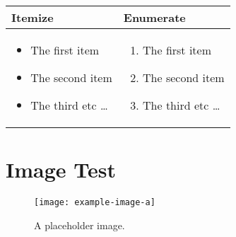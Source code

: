 \documentclass{article}
\begin{document}
\begin{table}[h]
    \centering
    \begin{tabular}{l|l}
        Itemize & Enumerate \\ \hline
        \begin{minipage}[t]{0.4\textwidth}
            \begin{itemize}
                \item The first item
                \item The second item
                \item The third etc \ldots
            \end{itemize}
        \end{minipage} &
        \begin{minipage}[t]{0.4\textwidth}
            \begin{enumerate}
                \item The first item
                \item The second item
                \item The third etc \ldots
            \end{enumerate}
        \end{minipage}
    \end{tabular}
\end{table}

\section{Image Test}

\begin{figure}[H]
  \centering
    \texttt{[image: example-image-a]}
    \caption{A placeholder image.}
\end{figure}
\end{document}
